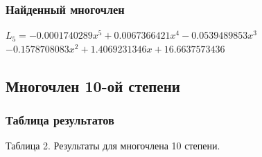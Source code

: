 \documentclass{article}
\begin{document}
				\subsubsection{Найденный многочлен}
			$ L_5 =-0.0001740289x^5+0.0067366421x^4-
			0.0539489853x^3 $
			$ -0.1578708083x^2+1.4069231346x+16.6637573436 $
	\newpage
		\subsection{Многочлен 10-ой степени}
		
			
			\subsubsection{Таблица результатов}
			
				\begin{flushright}
					Таблица 2. Результаты для многочлена 10 степени.
				\end{flushright}
			
\end{document}
